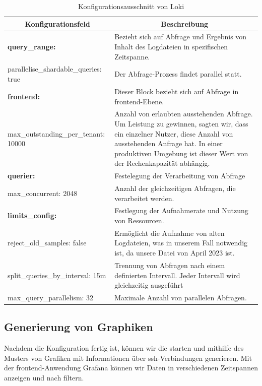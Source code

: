 \begin{table}[H]
  \begin{tabularx}{\textwidth}{|m{6cm}|X|}
  \hline
  \multicolumn{1}{|c|}{\textbf{Konfigurationsfeld}} & \multicolumn{1}{|c|}{\textbf{Beschreibung}} \\
  \hline
  \textbf{query\_range:} & Bezieht sich auf Abfrage und Ergebnis von Inhalt des Logdateien in spezifischen Zeitspanne. \\
  \hphantom{te}parallelise\_shardable\_queries: true & Der Abfrage-Prozess findet parallel statt.\\ \hline

  \textbf{frontend:} & Dieser Block bezieht sich auf Abfrage in \gls{frontend}-Ebene. \\
  \hphantom{te}max\_outstanding\_per\_tenant: 10000 & Anzahl von erlaubten  ausstehenden Abfrage. Um Leistung zu gewinnen, sagten wir, dass ein einzelner Nutzer, diese Anzahl von ausstehenden Anfrage hat. In einer produktiven Umgebung ist dieser Wert von der Rechenkapazität abhängig.\\ \hline

  \textbf{querier:} & Festelegung der Verarbeitung von Abfrage \\ 
  \hphantom{te}max\_concurrent: 2048 & Anzahl der gleichzeitigen Abfragen, die verarbeitet werden. \\ \hline

  \textbf{limits\_config:} & Festlegung der Aufnahmerate und Nutzung von Ressourcen. \\ 
  \hphantom{te}reject\_old\_samples: false & Ermöglicht die Aufnahme von alten Logdateien, was in unserem Fall notwendig ist, da unsere Datei von April 2023 ist. \\ 
  \hphantom{te}split\_queries\_by\_interval: 15m & Trennung von Abfragen nach einem definierten Intervall. Jeder Intervall wird gleichzeitig ausgeführt \\ 
  \hphantom{te}max\_query\_parallelism: 32 & Maximale Anzahl von parallelen Abfragen.  \\ \hline

  \end{tabularx}
  \caption[Konfigurationsausschnitt von Loki]
  {Konfigurationsausschnitt von Loki}
  \label{tab:KonfigLoki}
\end{table}

\newpage
\subsection{Generierung von Graphiken}
Nachdem die Konfiguration fertig ist, können wir die  starten und mithilfe des Musters von \cite{VoidQuark_sshlogs} Grafiken mit Informationen über \gls{ssh}-Verbindungen generieren. Mit der \gls{frontend}-Anwendung Grafana können wir Daten in verschiedenen Zeitspannen anzeigen und nach  filtern. 
 
